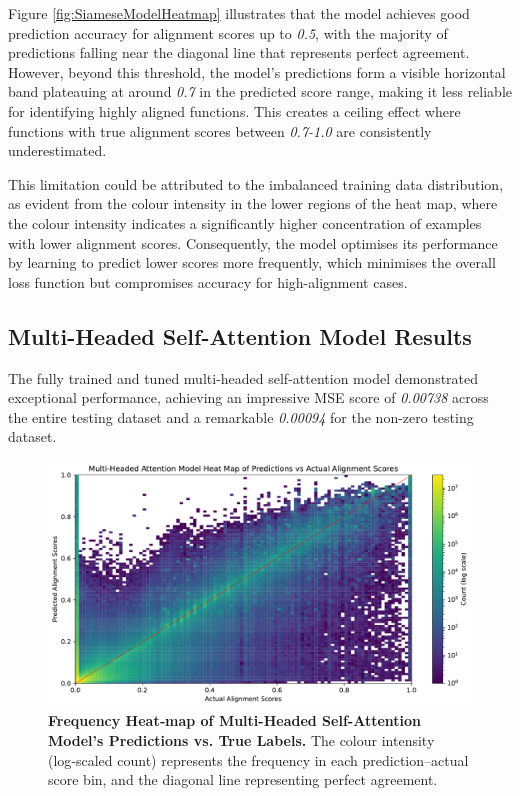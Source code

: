 Figure \ref{fig:SiameseModelHeatmap} illustrates that the model achieves good prediction accuracy for alignment scores up to \textit{0.5}, with the majority of predictions falling near the diagonal line that represents perfect agreement. However, beyond this threshold, the model's predictions form a visible horizontal band plateauing at around \textit{0.7} in the predicted score range, making it less reliable for identifying highly aligned functions. This creates a ceiling effect where functions with true alignment scores between \textit{0.7-1.0} are consistently underestimated.

This limitation could be attributed to the imbalanced training data distribution, as evident from the colour intensity in the lower regions of the heat map, where the colour intensity indicates a significantly higher concentration of examples with lower alignment scores. Consequently, the model optimises its performance by learning to predict lower scores more frequently, which minimises the overall loss function but compromises accuracy for high-alignment cases.

\subsection{Multi-Headed Self-Attention Model Results}
The fully trained and tuned multi-headed self-attention model demonstrated exceptional performance, achieving an impressive MSE score of \textit{0.00738} across the entire testing dataset and a remarkable \textit{0.00094} for the non-zero testing dataset.


\begin{figure}[tbh!]
\centering
\includegraphics[scale=0.65]{Figures/Multi-Headed_Attention_Model_Heatmap.pdf}
\caption{\textbf{Frequency Heat‑map of Multi-Headed Self-Attention Model's Predictions vs. True Labels.} The colour intensity (log‑scaled count) represents the frequency in each prediction–actual score bin, and the diagonal line representing perfect agreement.} 
\label{fig:AttentionModelHeatmap}
\end{figure}

